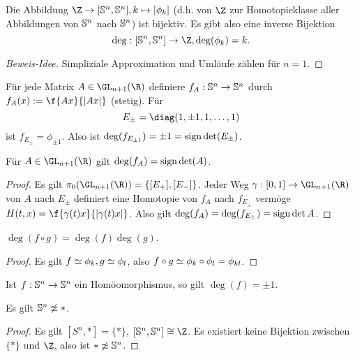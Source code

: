 \begin{st}
	Die Abbildung $\Z \to [\S^n, \S^n], k \mapsto [\phi_k]$ (d.h. von $\Z$ zur Homotopieklasse aller Abbildungen von $\S^n$ nach $\S^n$) ist bijektiv.
	Es gibt also eine inverse Bijektion
	\[
		\deg: [\S^n, \S^n] \to \Z,
		\deg(\phi_k) = k.
	\]
	\begin{proof}[Beweis-Idee]
		Simpliziale Approximation und Umläufe zählen für $n = 1$.
	\end{proof}
\end{st}

\begin{ex}
	Für jede Matrix $A \in \GL_{n+1}(\R)$ definiere $f_A: \S^n \to \S^n$ durch
	$f_A(x) := \f {Ax}{|Ax|}$ (stetig).
	Für
	\[
		E_\pm = \diag(1, \pm 1, 1, \dotsc, 1)
	\]
	ist $f_{E_\pm} = \phi_{\pm 1}$.
	Also ist $\deg(f_{E_{\pm 1}})  = \pm 1 = \sign \det (E_\pm)$.
\end{ex}

\begin{prop}
	Für $A \in \GL_{n+1} (\R)$ gilt $\deg(f_A) = \sign \det(A)$.
	\begin{proof}
		Es gilt $\pi_0(\GL_{n+1}(\R)) = \{ [E_+], [E_-] \}$.
		Jeder Weg $\gamma: [0,1] \to \GL_{n+1}(\R)$ von $A$ nach $E_\pm$ definiert eine Homotopie von $f_A$ nach $f_{E_\pm}$ vermöge $H(t, x) = \f {\gamma(t) x}{|\gamma(t) x |}$.
		Also gilt $\deg(f_A) = \deg(f_{E_\pm}) = \sign \det A$.
	\end{proof}
\end{prop}

\begin{kor}
	$\deg(f\circ g) = \deg(f) \deg(g)$.
	\begin{proof}
		Es gilt $f \homotopic \phi_k, g \homotopic \phi_l$, also $f \circ g \homotopic \phi_k \circ \phi_l = \phi_{kl}$.
	\end{proof}
\end{kor}

\begin{kor}
	Ist $f: \S^n \to \S^n$ ein Homöomorphismus, so gilt $\deg(f) = \pm 1$.
\end{kor}

\begin{kor}
	Es gilt $\S^n \not\homotopic *$.
	\begin{proof}
		Es gilt $[S^n, *] = \{*\}$, $[\S^n, \S^n] \isomorphic \Z$.
		Es existiert keine Bijektion zwischen $\{*\}$ und $\Z$, also ist $* \not\homotopic \S^n$.
	\end{proof}
\end{kor}

